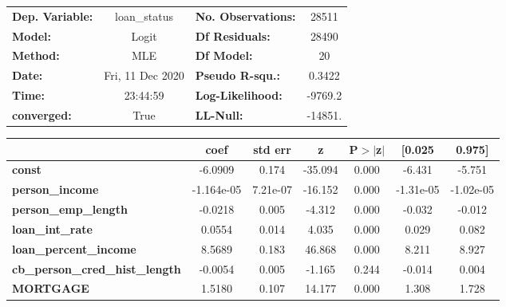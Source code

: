 \documentclass{report}
\begin{document}
\begin{center}
\begin{tabular}{lclc}
\toprule
\textbf{Dep. Variable:}                 &   loan\_status   & \textbf{  No. Observations:  } &    28511    \\
\textbf{Model:}                         &      Logit       & \textbf{  Df Residuals:      } &    28490    \\
\textbf{Method:}                        &       MLE        & \textbf{  Df Model:          } &       20    \\
\textbf{Date:}                          & Fri, 11 Dec 2020 & \textbf{  Pseudo R-squ.:     } &   0.3422    \\
\textbf{Time:}                          &     23:44:59     & \textbf{  Log-Likelihood:    } &   -9769.2   \\
\textbf{converged:}                     &       True       & \textbf{  LL-Null:           } &   -14851.   \\
\bottomrule
\end{tabular}
\begin{tabular}{lcccccc}
                                        & \textbf{coef} & \textbf{std err} & \textbf{z} & \textbf{P$> |$z$|$} & \textbf{[0.025} & \textbf{0.975]}  \\
\midrule
\textbf{const}                          &      -6.0909  &        0.174     &   -35.094  &         0.000        &       -6.431    &       -5.751     \\
\textbf{person\_income}                 &   -1.164e-05  &     7.21e-07     &   -16.152  &         0.000        &    -1.31e-05    &    -1.02e-05     \\
\textbf{person\_emp\_length}            &      -0.0218  &        0.005     &    -4.312  &         0.000        &       -0.032    &       -0.012     \\
\textbf{loan\_int\_rate}                &       0.0554  &        0.014     &     4.035  &         0.000        &        0.029    &        0.082     \\
\textbf{loan\_percent\_income}          &       8.5689  &        0.183     &    46.868  &         0.000        &        8.211    &        8.927     \\
\textbf{cb\_person\_cred\_hist\_length} &      -0.0054  &        0.005     &    -1.165  &         0.244        &       -0.014    &        0.004     \\
\textbf{MORTGAGE}                       &       1.5180  &        0.107     &    14.177  &         0.000        &        1.308    &        1.728     \\

\end{tabular}
\end{center}
\end{document}
